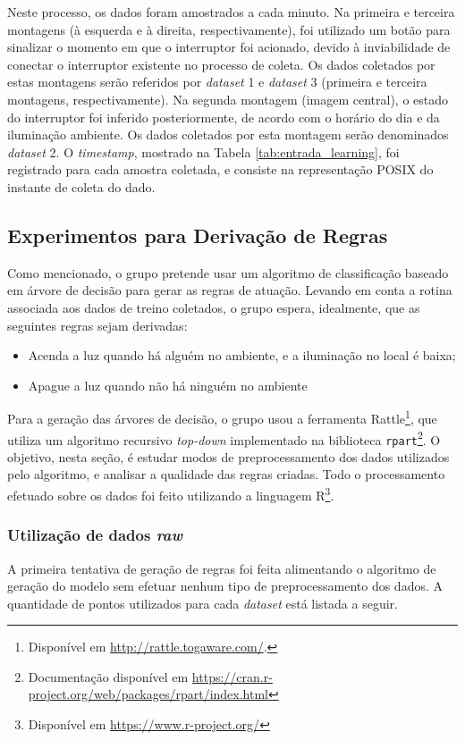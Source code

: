 Neste processo, os dados foram amostrados a cada minuto. Na primeira e terceira montagens (à esquerda e à direita, respectivamente), foi utilizado um botão para sinalizar o momento em que o interruptor foi acionado, devido à inviabilidade de conectar o interruptor existente no processo de coleta. Os dados coletados por estas montagens serão referidos por \textit{dataset} 1 e \textit{dataset} 3 (primeira e terceira montagens, respectivamente). Na segunda montagem (imagem central), o estado do interruptor foi inferido posteriormente, de acordo com o horário do dia e da iluminação ambiente. Os dados coletados por esta montagem serão denominados \textit{dataset} 2. O \textit{timestamp}, mostrado na Tabela \ref{tab:entrada_learning}, foi registrado para cada amostra coletada, e consiste na representação POSIX do instante de coleta do dado.

\subsection{Experimentos para Derivação de Regras}
Como mencionado, o grupo pretende usar um algoritmo de classificação baseado em árvore de decisão para gerar as regras de atuação. Levando em conta a rotina associada aos dados de treino coletados, o grupo espera, idealmente, que as seguintes regras sejam derivadas:
\begin{itemize}
	\item Acenda a luz quando há alguém no ambiente, e a iluminação no local é baixa;
	\item Apague a luz quando não há ninguém no ambiente
\end{itemize}

Para a geração das árvores de decisão, o grupo usou a ferramenta Rattle\footnote{Disponível em \url{http://rattle.togaware.com/}.}, que utiliza um algoritmo recursivo \textit{top-down} \cite{williams2011} implementado na biblioteca \texttt{rpart}\footnote{Documentação disponível em \url{https://cran.r-project.org/web/packages/rpart/index.html}}. O objetivo, nesta seção, é estudar modos de preprocessamento dos dados utilizados pelo algoritmo, e analisar a qualidade das regras criadas. Todo o processamento efetuado sobre os dados foi feito utilizando a linguagem R\footnote{Disponível em \url{https://www.r-project.org/}}.

\subsubsection{Utilização de dados \textit{raw}}
A primeira tentativa de geração de regras foi feita alimentando o algoritmo de geração do modelo sem efetuar nenhum tipo de preprocessamento dos dados. A quantidade de pontos utilizados para cada \textit{dataset} está listada a seguir.

